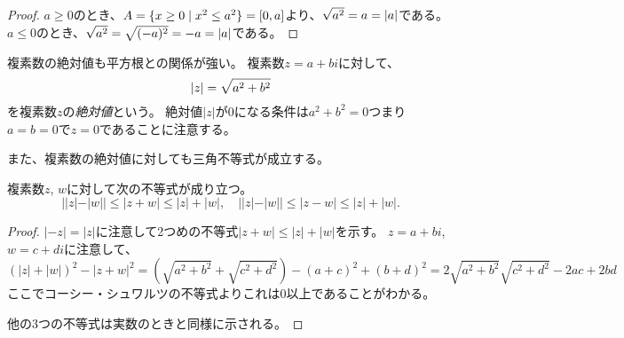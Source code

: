 \begin{proof}
$a \ge 0$のとき、$A = \{ x \ge 0 \mid x^2 \le a^2 \} = [0, a]$より、$\sqrt{a^2} = a = \abs{a}$である。
$a \le 0$のとき、$\sqrt{a^2} = \sqrt{(-a)^2} = -a = \abs{a}$である。
\end{proof}

複素数の絶対値も平方根との関係が強い。
複素数$z = a+b i$に対して、
$$
\abs{z} = \sqrt{a^2+b^2}
$$
を複素数$z$の\emph{絶対値}という。
絶対値$|z|$が$0$になる条件は$a^2+b^2 = 0$つまり$a = b = 0$で$z = 0$であることに注意する。

また、複素数の絶対値に対しても三角不等式が成立する。

\begin{proposition}[複素数の絶対値の三角不等式]
複素数$z$, $w$に対して次の不等式が成り立つ。
$$
||z|-|w|| \le |z+w| \le |z|+|w|,
\quad ||z|-|w|| \le |z-w| \le |z|+|w|.
$$
\end{proposition}

\begin{proof}
$|-z| = |z|$に注意して2つめの不等式$|z+w| \le |z|+|w|$を示す。
$z = a+b i$, $w = c+d i$に注意して、
$$
(|z|+|w|)^2-|z+w|^2
= (\sqrt{a^2+b^2}+\sqrt{c^2+d^2})-(a+c)^2+(b+d)^2
= 2\sqrt{a^2+b^2}\sqrt{c^2+d^2}-2 a c+2 b d
$$
ここでコーシー・シュワルツの不等式よりこれは$0$以上であることがわかる。

他の3つの不等式は実数のときと同様に示される。
\end{proof}
